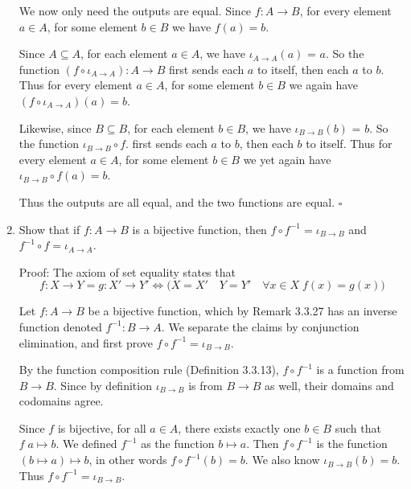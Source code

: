 \documentclass{assignment}
\newenvironment{q}
    {\begin{bfseries}}
    {\end{bfseries}}
\begin{document}
\begin{enumerate}
    We now only need the outputs are equal. Since $f: A \to B$, for every element $a \in A$, for some element $b \in B$ we have $f(a)=b$. 

    Since $A \subseteq A$, for each element $a \in A$, we have $\iota_{A\to A}(a)$ = $a$.
    So the function $(f \circ \iota_{A \to A}): A \to B$ first sends each $a$ to itself, then each $a$ to $b$. 
    Thus for every element $a \in A$, for some element $b \in B$ we again have $(f \circ \iota_{A \to A})(a)=b$.
    
    Likewise, since $B \subseteq B$, for each element $b \in B$, we have $\iota_{B\to B}(b)$ = $b$. 
    So the function $\iota_{B \to B} \circ f.$ first sends each $a$ to $b$, then each $b$ to itself. 
    Thus for every element $a \in A$, for some element $b \in B$ we yet again have $\iota_{B \to B} \circ f(a)=b$.

    Thus the outputs are all equal, and the two functions are equal. 
    $\square$

    \item \begin{q}
        Show that if $f: A \to B$ is a bijective function, then $f \circ f^{-1} = \iota_{B \to B}$ and $f^{-1} \circ f = \iota_{A \to A}$.
    \end{q}

    Proof:
    The axiom of set equality states that
    \begin{equation*}
            f: X \to Y
            =
            g: X' \to Y'
        \iff 
        \biggl(
            X=X' \quad
            Y=Y' \quad 
            \forall x \in X \;
                f(x)=g(x)
        \biggr)
    \end{equation*}

    Let $f: A \to B$ be a bijective function, which by Remark 3.3.27 has an inverse function denoted $f^{-1}: B \to A$. 
    We separate the claims by conjunction elimination, and first prove $f \circ f^{-1} = \iota_{B \to B}$. 

    By the function composition rule (Definition 3.3.13), $f \circ f^{-1}$ is a function from $B \to B$. Since by definition $\iota_{B \to B}$ is from $B \to B$ as well, their domains and codomains agree.

    Since $f$ is bijective, for all $a \in A$, there exists exactly one $b \in B$ such that $f \; a \mapsto b$. We defined $f^{-1}$ as the function $b \mapsto a$. Then $f \circ f^{-1}$ is the function $(b \mapsto a) \mapsto b$, in other words $f \circ f^{-1}(b)=b$. We also know $\iota_{B \to B}(b)=b$. Thus $f \circ f^{-1} = \iota_{B \to B}$.


\end{enumerate}
\end{document}
